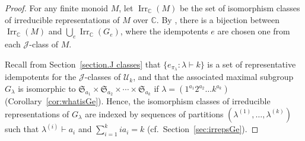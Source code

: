 \documentclass[10pt]{amsart}
\theoremstyle{definition}
\theoremstyle{remark}
\newcommand{\CC}{\mathbb C}
\newcommand{\cf}{cf.\ }
\begin{document}
\begin{proof}
    For any finite monoid $M$, let $\operatorname{Irr}_\mathbb{C}(M)$ be
    the set of isomorphism classes of irreducible representations of $M$ over $\CC$.
    By \cite[Corollary 5.6]{Steinberg.2016}, there is a bijection between
    $\operatorname{Irr}_\mathbb{C}(M)$
    and
    $\bigcup_{e} \operatorname{Irr}_\mathbb{C}(G_e)$,
    where the idempotents $e$ are chosen one from each $\mathscr{J}$-class of $M$.

    Recall from Section~\ref{section.J classes} that
    $\{e_{\pi_\lambda} : \lambda \vdash k\}$ is a set of representative
    idempotents for the $\mathscr{J}$-classes of $\mathcal{U}_k$,
    and that the associated maximal subgroup $G_\lambda$ is isomorphic to
    $\mathfrak{S}_{a_1} \times \mathfrak{S}_{a_2} \times \cdots \times \mathfrak{S}_{a_k}$
    if $\lambda = (1^{a_1}2^{a_2} \ldots k^{a_k})$ (Corollary~\ref{cor:whatisGe}).
    Hence, the isomorphism classes of irreducible representations of
    $G_\lambda$ are indexed by sequences of partitions $(\lambda^{(1)},
    \ldots, \lambda^{(k)})$ such that $\lambda^{(i)}\vdash a_i$
    and $\sum_{i=1}^k ia_i = k$ (\cf Section~\ref{sec:irrepsGe}).
\end{proof}
\end{document}
